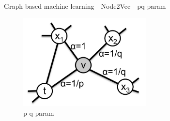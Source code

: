 \begin{frame}{Graph-based machine learning - Node2Vec - pq param}
    \begin{figure}[htp]
        \centering
        \includegraphics[width=0.6\textwidth]{topics/201010-zhang2019comprehensive/assets/img/p-q-param.png}
        \caption{p q param \cite{grover2016node2vec}}
    \end{figure}
\end{frame}